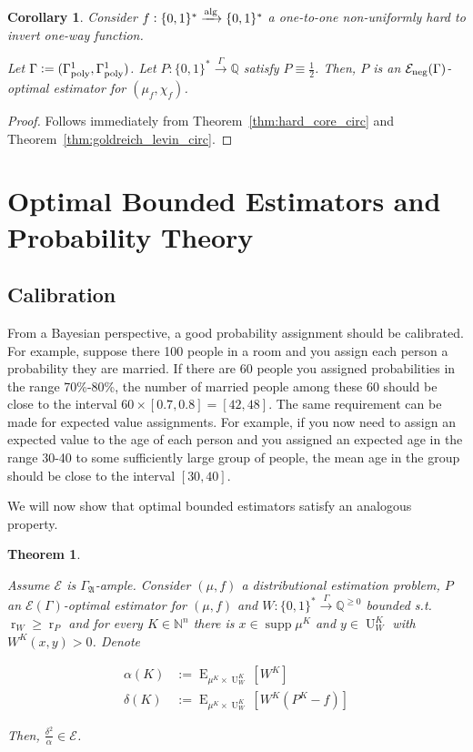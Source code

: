 \documentclass{article}
\numberwithin{equation}{section}
\theoremstyle{definition}
\theoremstyle{plain}
\newtheorem{theorem}{Theorem}[section]
\newtheorem{corollary}{Corollary}[section]
\newcommand{\Bool}{\{0,1\}}
\newcommand{\Words}{{\Bool^*}}
\DeclareMathOperator{\Supp}{supp}
\DeclareMathOperator{\E}{E}
\DeclareMathOperator{\R}{r}
\DeclareMathOperator{\Un}{U}
\newcommand{\Nats}{\mathbb{N}}
\newcommand{\Rats}{\mathbb{Q}}
\newcommand{\GrowA}{\Gamma_{\mathfrak{A}}}
\newcommand{\Fall}{\mathcal{E}}
\newcommand{\EG}{\Fall(\Gamma)}
\newcommand{\GammaPoly}{\Gamma_{\textnormal{poly}}}
\newcommand{\Alg}{\xrightarrow{\textnormal{alg}}}
\newcommand{\Scheme}{\xrightarrow{\Gamma}}
\begin{document}
\begin{corollary}

Consider $f: \Words \Alg \Words$ a one-to-one non-uniformly hard to invert one-way function.

Let $\Gamma:=(\GammaPoly^1,\GammaPoly^1)$. Let $P: \Words \Scheme \Rats$ satisfy $P \equiv \frac{1}{2}$. Then, $P$ is an $\Fall_{\textnormal{neg}}(\Gamma)$-optimal estimator for $(\mu_f, \chi_f)$.

\end{corollary}

\begin{proof}

Follows immediately from Theorem~\ref{thm:hard_core_circ} and Theorem~\ref{thm:goldreich_levin_circ}.
\end{proof}

\section{Optimal Bounded Estimators and Probability Theory}
\label{sec:probability}

\subsection{Calibration}

From a Bayesian perspective, a good probability assignment should be calibrated. For example, suppose there 100 people in a room and you assign each person a probability they are married. If there are 60 people you assigned probabilities in the range 70\%-80\%, the number of married people among these 60 should be close to the interval $60 \times [0.7, 0.8] = [42,48]$. The same requirement can be made for expected value assignments. For example, if you now need to assign an expected value to the age of each person and you assigned an expected age in the range 30-40 to some sufficiently large group of people, the mean age in the group should be close to the interval $[30,40]$. 

We will now show that optimal bounded estimators satisfy an analogous property.

\begin{theorem}
\label{thm:calib}

Assume $\Fall$ is $\GrowA$-ample. Consider $(\mu,f)$ a distributional estimation problem, $P$ an $\EG$-optimal estimator for $(\mu,f)$ and ${W: \Words \Scheme \Rats^{\geq 0}}$ bounded s.t. $\R_W \geq \R_P$ and for every $K \in \Nats^n$ there is $x \in \Supp \mu^{K}$ and $y \in \Un_W^{K}$ with $W^{K}(x,y) > 0$. Denote

\begin{align*}
\alpha(K)&:=\E_{\mu^{K} \times \Un_W^{K}}[W^{K}] \\ 
\delta(K)&:=\E_{\mu^{K} \times \Un_W^{K}}[W^{K}(P^{K}-f)]
\end{align*} 

Then, $\frac{\delta^2}{\alpha} \in \Fall$.

\end{theorem}
\end{document}

